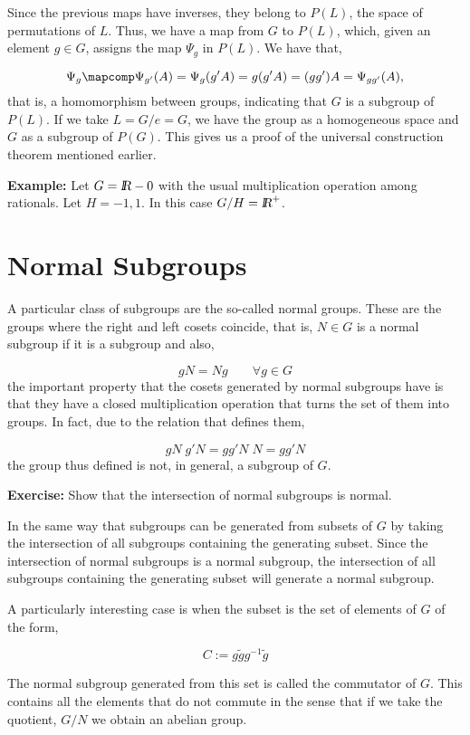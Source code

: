 Since the previous maps have inverses, they belong to $P(L)$, the space of permutations of $L$. Thus, we have a map from $G$ to $P(L)$, which, given an element $g \in G$, assigns the map $\Psi_{g}$ in $P(L)$. We have that,

\[ 
\Psi_{g} \mapcomp \Psi_{g'} (A) = \Psi_{g}(g'A) = g(g'A) = (gg') A = \Psi_{gg'} (A), 
\] 
% 
that is, a homomorphism between groups, indicating that $G$ is a subgroup of $P(L)$. 
If we take $L=G/e=G$, we have the group as a homogeneous space and $G$ as a subgroup of $P(G)$. 
This gives us a proof of the universal construction theorem mentioned earlier.

\textbf{Example:} Let $G = \mbox{\sl {l$\!\!\!\;\:\!$R}} -{0}$ with the usual multiplication operation among rationals. Let $H={-1,1}$. In this case $G/H = \mbox{\sl {l$\!\!\!\;\:\!$R}}^{+}$.

\section{Normal Subgroups}

A particular class of subgroups are the so-called normal groups. These are the groups where the right and left cosets coincide, 
that is, $N\in G$ is a normal subgroup if it is a subgroup and also,

\[ 
gN = Ng \;\;\;\;\;\;\; \forall g \in G 
\] 
% 
the important property that the cosets generated by normal subgroups have is that they have a closed multiplication operation that turns the set of them into groups. 
In fact, due to the relation that defines them,

\[ 
gN \; g'N = g g' N \; N = gg'N 
\] %
the group thus defined is not, in general, a subgroup of $G$.

\textbf{Exercise:} Show that the intersection of normal subgroups is normal.

In the same way that subgroups can be generated from subsets of $G$ by taking the intersection of all subgroups containing the generating subset. Since the intersection of normal subgroups is a normal subgroup, the intersection of all subgroups containing the generating subset will generate a normal subgroup.

A particularly interesting case is when the subset is the set of elements of $G$ of the form,

\[ 
C:={g\tilde{g} g^{-1}\tilde{g}} 
\]

The normal subgroup generated from this set is called the commutator of $G$. This contains all the elements that do not commute in the sense that if we take the quotient, $G/N$ we obtain an abelian group.

